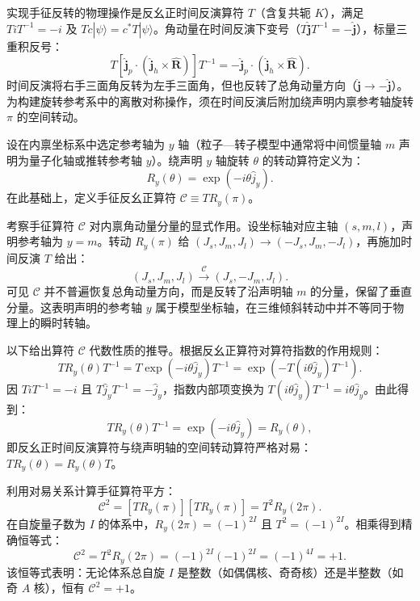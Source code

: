 实现手征反转的物理操作是反幺正时间反演算符 $T$（含复共轭 $K$），满足 $T i T^{-1} = -i$ 及 $T c |\psi\rangle = c^* T |\psi\rangle$。角动量在时间反演下变号（$T \hat{\mathbf{j}} T^{-1} = -\hat{\mathbf{j}}$），标量三重积反号：
\begin{equation}\label{eq:3-5-T-triple}
T \left[ \hat{\mathbf{j}}_p \cdot (\hat{\mathbf{j}}_h \times \hat{\mathbf{R}}) \right] T^{-1} = - \hat{\mathbf{j}}_p \cdot (\hat{\mathbf{j}}_h \times \hat{\mathbf{R}}).
\end{equation}
时间反演将右手三面角反转为左手三面角，但也反转了总角动量方向（$\hat{\mathbf{j}} \to -\hat{\mathbf{j}}$）。为构建旋转参考系中的离散对称操作，须在时间反演后附加绕声明内禀参考轴旋转 $\pi$ 的空间转动。

设在内禀坐标系中选定参考轴为 $y$ 轴（粒子—转子模型中通常将中间惯量轴 $m$ 声明为量子化轴或推转参考轴 $y$）。绕声明 $y$ 轴旋转 $\theta$ 的转动算符定义为：
\begin{equation}\label{eq:3-5-Ry}
R_y(\theta) = \exp(-i \theta \hat{j}_y).
\end{equation}
在此基础上，定义手征反幺正算符 $\mathcal{C} \equiv T R_y(\pi)$。

考察手征算符 $\mathcal{C}$ 对内禀角动量分量的显式作用。设坐标轴对应主轴 $(s, m, l)$，声明参考轴为 $y = m$。转动 $R_y(\pi)$ 给 $(J_s, J_m, J_l) \to (-J_s, J_m, -J_l)$，再施加时间反演 $T$ 给出：
\begin{equation}\label{eq:3-5-C-action}
(J_s, J_m, J_l) \xrightarrow{\mathcal{C}} (J_s, -J_m, J_l).
\end{equation}
可见 $\mathcal{C}$ 并不普遍恢复总角动量方向，而是反转了沿声明轴 $m$ 的分量，保留了垂直分量。这表明声明的参考轴 $y$ 属于模型坐标轴，在三维倾斜转动中并不等同于物理上的瞬时转轴。

以下给出算符 $\mathcal{C}$ 代数性质的推导。根据反幺正算符对算符指数的作用规则：
\begin{equation}\label{eq:3-5-T-Ry-commute}
T R_y(\theta) T^{-1} = T \exp(-i \theta \hat{j}_y) T^{-1} = \exp\left( - T(i \theta \hat{j}_y) T^{-1} \right).
\end{equation}
因 $T i T^{-1} = -i$ 且 $T \hat{j}_y T^{-1} = -\hat{j}_y$，指数内部项变换为 $T (i \theta \hat{j}_y) T^{-1} = i \theta \hat{j}_y$。由此得到：
\begin{equation}\label{eq:3-5-T-Ry-res}
T R_y(\theta) T^{-1} = \exp(-i \theta \hat{j}_y) = R_y(\theta),
\end{equation}
即反幺正时间反演算符与绕声明轴的空间转动算符严格对易：$T R_y(\theta) = R_y(\theta) T$。

利用对易关系计算手征算符平方：
\begin{equation}\label{eq:3-5-C-sq-decomp}
\mathcal{C}^2 = [T R_y(\pi)] [T R_y(\pi)] = T^2 R_y(2\pi).
\end{equation}
在自旋量子数为 $I$ 的体系中，$R_y(2\pi) = (-1)^{2I}$ 且 $T^2 = (-1)^{2I}$。相乘得到精确恒等式：
\begin{equation}\label{eq:3-5-C-sq-identity}
\mathcal{C}^2 = T^2 R_y(2\pi) = (-1)^{2I} (-1)^{2I} = (-1)^{4I} = +1.
\end{equation}
该恒等式表明：无论体系总自旋 $I$ 是整数（如偶偶核、奇奇核）还是半整数（如奇 $A$ 核），恒有 $\mathcal{C}^2 = +1$。

